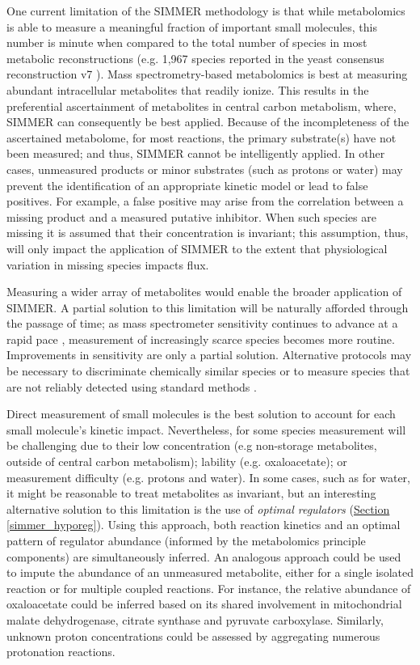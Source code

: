 One current limitation of the SIMMER methodology is that while metabolomics is able to measure a meaningful fraction of important small molecules, this number is minute when compared to the total number of species in most metabolic reconstructions (e.g. 1,967 species reported in the yeast consensus reconstruction v7 \cite{BenjaminDHeavner:2013bp}). Mass spectrometry-based metabolomics is best at measuring abundant intracellular metabolites that readily ionize. This results in the preferential ascertainment of metabolites in central carbon metabolism, where, SIMMER can consequently be best applied. Because of the incompleteness of the ascertained metabolome, for most reactions, the primary substrate(s) have not been measured; and thus, SIMMER cannot be intelligently applied. In other cases, unmeasured products or minor substrates (such as protons or water) may prevent the identification of an appropriate kinetic model or lead to false positives. For example, a false positive may arise from the correlation between a missing product and a measured putative inhibitor. When such species are missing it is assumed that their concentration is invariant; this assumption, thus, will only impact the application of SIMMER to the extent that physiological variation in missing species impacts flux.

Measuring a wider array of metabolites would enable the broader application of SIMMER. A partial solution to this limitation will be naturally afforded through the passage of time; as mass spectrometer sensitivity continues to advance at a rapid pace \cite{Radionova:2015gs}, measurement of increasingly scarce species becomes more routine. Improvements in sensitivity are only a partial solution. Alternative protocols may be necessary to discriminate chemically similar species or to measure species that are not reliably detected using standard methods \cite{Lammerhofer:2013tz}.

Direct measurement of small molecules is the best solution to account for each small molecule's kinetic impact. Nevertheless, for some species measurement will be challenging due to their low concentration (e.g non-storage metabolites, outside of central carbon metabolism); lability (e.g. oxaloacetate); or measurement difficulty (e.g. protons and water). In some cases, such as for water, it might be reasonable to treat metabolites as invariant, but an interesting alternative solution to this limitation is the use of \textit{optimal regulators} (\hyperref[simmer_hyporeg]{Section \ref{simmer_hyporeg}}). Using this approach, both reaction kinetics and an optimal pattern of regulator abundance (informed by the metabolomics principle components) are simultaneously inferred. An analogous approach could be used to impute the abundance of an unmeasured metabolite, either for a single isolated reaction or for multiple coupled reactions.  For instance, the relative abundance of oxaloacetate could be inferred based on its shared involvement in mitochondrial malate dehydrogenase, citrate synthase and pyruvate carboxylase. Similarly, unknown proton concentrations could be assessed by aggregating numerous protonation reactions. 

